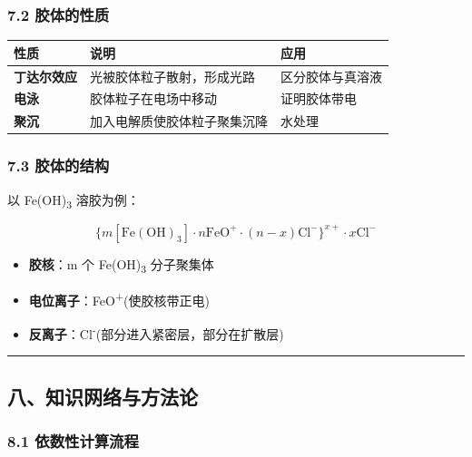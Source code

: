 \documentclass[a4paper,11pt]{ctexart}
\providecommand{\tightlist}{\setlength{\itemsep}{0pt}\setlength{\parskip}{0pt}}
\newcounter{none}
\newcommand{\箭}{\ensuremath{\rightarrow}}
\newcommand{\左箭}{\ensuremath{\leftarrow}}
\newcommand{\上箭}{\ensuremath{\uparrow}}
\newcommand{\下箭}{\ensuremath{\downarrow}}
\newcommand{\衡}{\ensuremath{\rightleftharpoons}}
\newcommand{\双箭}{\ensuremath{\leftrightarrow}}
\newcommand{\约等于}{\ensuremath{\approx}}
\newcommand{\小于等于}{\ensuremath{\leq}}
\newcommand{\大于等于}{\ensuremath{\geq}}
\newcommand{\不等于}{\ensuremath{\neq}}
\newcommand{\西格马}{\ensuremath{\sigma}}
\newcommand{\派}{\ensuremath{\pi}}
\begin{document}
\subsubsection{7.2 胶体的性质}\label{ux80f6ux4f53ux7684ux6027ux8d28}

{\def\LTcaptype{none} %
\begin{longtable}[]{@{}lll@{}}
\toprule\noalign{}
性质 & 说明 & 应用 \\
\midrule\noalign{}
\endhead
\bottomrule\noalign{}
\endlastfoot
\textbf{丁达尔效应} & 光被胶体粒子散射，形成光路 & 区分胶体与真溶液 \\
\textbf{电泳} & 胶体粒子在电场中移动 & 证明胶体带电 \\
\textbf{聚沉} & 加入电解质使胶体粒子聚集沉降 & 水处理 \\
\end{longtable}
}

\subsubsection{7.3 胶体的结构}\label{ux80f6ux4f53ux7684ux7ed3ux6784}

以 Fe(OH)\textsubscript{3} 溶胶为例：

\[
\{m[\mathrm{Fe(OH)_3}] \cdot n\mathrm{FeO^+} \cdot (n-x)\mathrm{Cl^-}\}^{x+} \cdot x\mathrm{Cl^-}
\]

\begin{itemize}
\tightlist
\item
  \textbf{胶核}：m 个 Fe(OH)\textsubscript{3} 分子聚集体
\item
  \textbf{电位离子}：FeO\textsuperscript{+}(使胶核带正电)
\item
  \textbf{反离子}：Cl\textsuperscript{-}(部分进入紧密层，部分在扩散层)
\end{itemize}

\begin{center}\rule{0.5\linewidth}{0.5pt}\end{center}

\subsection{八、知识网络与方法论}\label{ux516bux77e5ux8bc6ux7f51ux7edcux4e0eux65b9ux6cd5ux8bba}

\subsubsection{8.1 依数性计算流程}\label{ux4f9dux6570ux6027ux8ba1ux7b97ux6d41ux7a0b}
\end{document}

